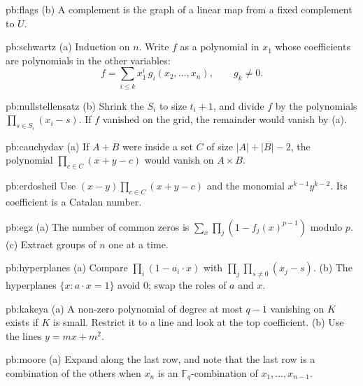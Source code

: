 \begin{hint}{pb:flags}
(b) A complement is the graph of a linear map from a fixed complement to $U$.
\end{hint}

\begin{hint}{pb:schwartz}
(a) Induction on $n$. Write $f$ as a polynomial in $x_1$ whose coefficients are polynomials in the other variables:
\[
f=\sum_{i\le k}x_1^i\,g_i(x_2,\dots,x_n),\qquad g_k\ne0.
\]
\end{hint}

\begin{hint}{pb:nullstellensatz}
(b) Shrink the $S_i$ to size $t_i+1$, and divide $f$ by the polynomials $\prod_{s\in S_i}(x_i-s)$. If $f$ vanished on the grid, the
remainder would vanish by (a).
\end{hint}

\begin{hint}{pb:cauchydav}
(a) If $A+B$ were inside a set $C$ of size $|A|+|B|-2$, the polynomial $\prod_{c\in C}(x+y-c)$ would vanish on $A\times B$.
\end{hint}

\begin{hint}{pb:erdosheil}
Use $(x-y)\prod_{c\in C}(x+y-c)$ and the monomial $x^{k-1}y^{k-2}$. Its coefficient is a Catalan number.
\end{hint}

\begin{hint}{pb:egz}
(a) The number of common zeros is $\sum_x\prod_j(1-f_j(x)^{p-1})$ modulo $p$. (c) Extract groups of $n$ one at a time.
\end{hint}

\begin{hint}{pb:hyperplanes}
(a) Compare $\prod_i(1-a_i\cdot x)$ with $\prod_j\prod_{s\ne0}(x_j-s)$. (b) The hyperplanes $\{x:a\cdot x=1\}$ avoid $0$; swap the
roles of $a$ and $x$.
\end{hint}

\begin{hint}{pb:kakeya}
(a) A non-zero polynomial of degree at most $q-1$ vanishing on $K$ exists if $K$ is small. Restrict it to a line and look at the
top coefficient. (b) Use the lines $y=mx+m^2$.
\end{hint}

\begin{hint}{pb:moore}
(a) Expand along the last row, and note that the last row is a combination of the others when $x_n$ is an $\mathbb F_q$-combination
of $x_1,\dots,x_{n-1}$.
\end{hint}

